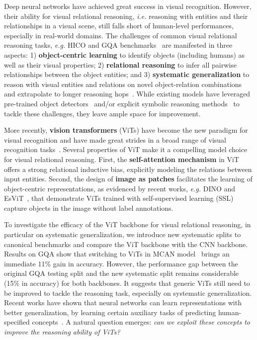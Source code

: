 \documentclass{article} \usepackage{iclr2022_conference,times}
\begin{document}
Deep neural networks have achieved great success in visual recognition. However, their ability for visual relational reasoning, \emph{i.e.} reasoning with entities and their relationships in a visual scene, still falls short of human-level performances, especially in real-world domains. The challenges of common visual relational reasoning tasks, \emph{e.g.} HICO and GQA benchmarks~\citep{hico,gqa} are manifested in three aspects:
1) \textbf{object-centric learning} to identify objects (including humans) as well as their visual properties; 2) \textbf{relational reasoning} to infer all pairwise relationships between the object entities; and 3) \textbf{systematic generalization} to reason with visual entities and relations on novel object-relation combinations and extrapolate to longer reasoning hops~\citep{systematic2,systematic1}. While existing models have leveraged pre-trained object detectors~\citep{frcnn,jiang2020defense} and/or explicit symbolic reasoning methods~\citep{nsvqa} to tackle these challenges, they leave ample space for improvement.


More recently, \textbf{vision transformers} (ViTs) have become the new paradigm for visual recognition and have made great strides in a broad range of visual recognition tasks~\citep{vit,pvt,liu2021swin}. Several properties of ViT make it a compelling model choice for visual relational reasoning. First, the \textbf{self-attention mechanism} in ViT offers a strong relational inductive bias, explicitly modeling the relations between input entities. Second, the design of \textbf{image as patches} facilitates the learning of object-centric representations, as evidenced by recent works, \emph{e.g.} DINO and EsViT~\citep{dino,esvit}, that demonstrate ViTs trained with self-supervised learning (SSL) capture objects in the image without label annotations.

To investigate the efficacy of the ViT backbone for visual relational reasoning, in particular on systematic generalization, we introduce new systematic splits to canonical benchmarks and compare the ViT backbone with the CNN backbone. Results on GQA show that switching to ViTs in MCAN model~\citep{mcan} brings an immediate 11\% gain in accuracy. However, the performance gap between the original GQA testing split and the new systematic split remains considerable (15\% in accuracy) for both backbones. 
It suggests that generic ViTs still need to be improved to tackle the reasoning task, especially on systematic generalization. 
Recent works have shown that neural networks can learn representations with better generalization, by learning certain auxiliary tasks of predicting human-specified concepts~\citep{hill2020grounded,koh2020concept}. 
A natural question emerges: {\em can we exploit these concepts to improve the reasoning ability of ViTs?}
\end{document}
